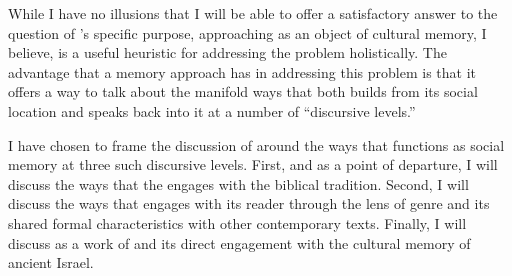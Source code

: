 While I have no illusions that I will be able to offer a satisfactory answer to the question of \ga's specific purpose, approaching \ga as an object of cultural memory, I believe, is a useful heuristic for addressing the problem holistically. The advantage that a memory approach has in addressing this problem is that it offers a way to talk about the manifold ways that \ga both builds from its social location and speaks back into it at a number of ``discursive levels.''

I have chosen to frame the discussion of \ga around the ways that \ga functions as social memory at three such discursive levels. First, and as a point of departure, I will discuss the ways that the \ga engages with the biblical tradition. Second, I will discuss the ways that \ga engages with its reader through the lens of genre and its shared formal characteristics with other contemporary texts. Finally, I will discuss \ga as a work of \psy and its direct engagement with the cultural memory of ancient Israel.

